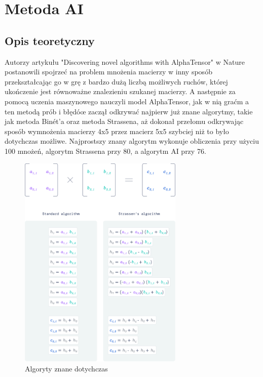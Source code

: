 \documentclass{article}
\begin{document}
\section{Metoda AI}

\subsection{Opis teoretyczny}

Autorzy artykułu "Discovering novel algorithms with AlphaTensor" w Nature postanowili spojrzeć na problem mnożenia macierzy w inny sposób przekształcając go w grę z bardzo dużą liczbą możliwych ruchów, której ukończenie jest równoważne znalezieniu szukanej macierzy. A następnie za pomocą uczenia maszynowego nauczyli model AlphaTensor, jak w nią graćm a ten metodą prób i błędóœ zaczął odkrywać najpierw już znane algorytmy, takie jak metoda Binét’a oraz metoda Strassena, aż dokonał przełomu odkrywając sposób wymnożenia macierzy 4x5 przez macierz 5x5 szybciej niż to było dotychczas możliwe. Najprostszy znany algorytm wykonuje obliczenia przy użyciu 100 mnożeń, algorytm Strassena przy 80, a algorytm AI przy 76.
\bigbreak

\begin{figure}[H]
  \centering
    \includegraphics[width=0.7\textwidth]{images/standard_algorithms.png}
  \caption{Algoryty znane dotychczas}
\end{figure}
\end{document}
